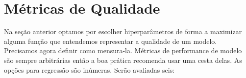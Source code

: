 \begin{figure}[H]
    \centering
    
\end{figure}

\section{Métricas de Qualidade}

Na seção anterior optamos por escolher hiperparâmetros de forma a maximizar alguma função que entendemos representar a qualidade de um modelo. Precisamos agora definir como mensura-la. Métricas de performance de modelo são sempre arbitrárias então a boa prática recomenda usar uma cesta delas. As opções para regressão são inúmeras. Serão avaliadas seis: 


